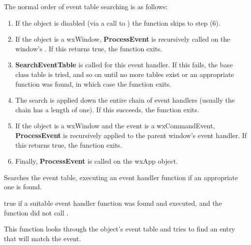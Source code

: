 The normal order of event table searching is as follows:

\begin{enumerate}\itemsep=0pt
\item If the object is disabled (via a call to )
the function skips to step (6).
\item If the object is a wxWindow, {\bf ProcessEvent} is recursively called on the window's\rtfsp
{}. If this returns true, the function exits.
\item {\bf SearchEventTable} is called for this event handler. If this fails, the base
class table is tried, and so on until no more tables exist or an appropriate function was found,
in which case the function exits.
\item The search is applied down the entire chain of event handlers (usually the chain has a length
of one). If this succeeds, the function exits.
\item If the object is a wxWindow and the event is a wxCommandEvent, {\bf ProcessEvent} is
recursively applied to the parent window's event handler. If this returns true, the function exits.
\item Finally, {\bf ProcessEvent} is called on the wxApp object.
\end{enumerate}



\label{wxevthandlersearcheventtable}


Searches the event table, executing an event handler function if an appropriate one
is found.





true if a suitable event handler function was found and executed, and the function did not
call .


This function looks through the object's event table and tries to find an entry
that will match the event.

